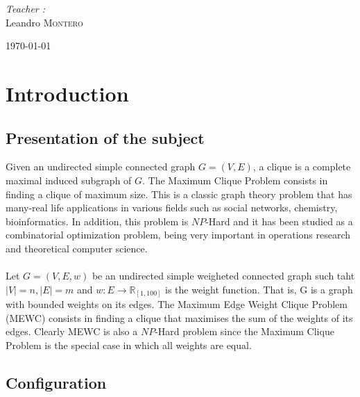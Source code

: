 \documentclass{article}
\begin{document}
\begin{center} \Large
    \emph{Teacher :}\\
    Leandro \textsc{Montero}
\end{center}

\vfill

\begin{center} \Large
    \today
\end{center}

\newpage


\tableofcontents
\newpage


\section{Introduction}

\subsection{Presentation of the subject}

    Given an undirected simple connected graph $G =(V,E)$, a clique is a complete maximal induced subgraph of $G$. The Maximum Clique Problem consists in finding a clique of maximum size. This is a classic graph theory problem that has many-real life applications in various fields such as social networks, chemistry, bioinformatics. In addition, this problem is $NP$-Hard and it has been studied as a combinatorial optimization problem, being very important in operations research and theoretical computer science.
    \\ \\
    Let $G = (V,E,w)$ be an undirected simple weigheted connected graph such taht $|V| = n, |E|=m$ and $w : E \rightarrow \mathbb{R}_{[1,100]}$ is the weight function. That is, G is a graph with bounded weights on its edges. The Maximum Edge Weight Clique Problem (MEWC) consists in finding a clique that maximises the sum of the weights of its edges. Clearly MEWC is also a $NP$-Hard problem since the Maximum Clique Problem is the special case in which all weights are equal.


\subsection{Configuration}
\end{document}
